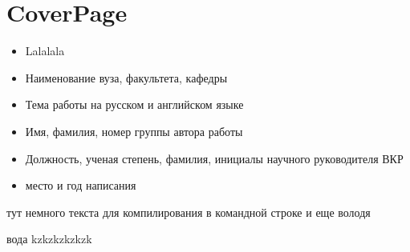 \documentclass[11pt]{article}
\begin{document}
    \section*{CoverPage}
        \begin{itemize}
            \item Lalalala
            \item Наименование вуза, факультета, кафедры
            \item Тема работы на русском и английском языке
            \item Имя, фамилия, номер группы автора работы
            \item Должность, ученая степень, фамилия,
            инициалы научного руководителя ВКР
            \item место и год написания
        \end{itemize}
	тут немного 
	текста для компилирования в командной строке
	и еще
    володя

    вода
    kzkzkzkzkzk
	
\end{document}

